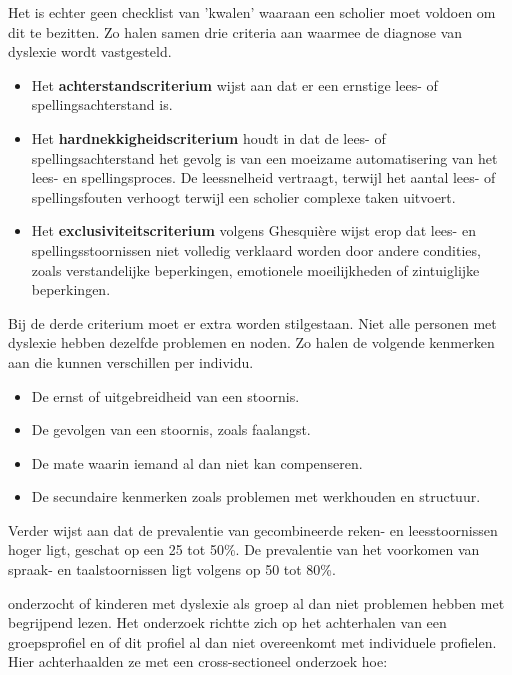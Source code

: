 Het is echter geen checklist van 'kwalen' waaraan een scholier moet voldoen om dit te bezitten. Zo halen \textcite{Kleijnen2008, Ghesquiere2018} samen drie criteria aan waarmee de diagnose van dyslexie wordt vastgesteld.

\begin{itemize}
	\item Het \textbf{achterstandscriterium} wijst aan dat er een ernstige lees- of spellingsachterstand is. 
	\item Het \textbf{hardnekkigheidscriterium} houdt in dat de lees- of spellingsachterstand het gevolg is van een moeizame automatisering van het lees- en spellingsproces. De leessnelheid vertraagt, terwijl het aantal lees- of spellingsfouten verhoogt terwijl een scholier complexe taken uitvoert.
	\item Het \textbf{exclusiviteitscriterium} volgens Ghesquière wijst erop dat lees- en spellingsstoornissen niet volledig verklaard worden door andere condities, zoals verstandelijke beperkingen, emotionele moeilijkheden of zintuiglijke beperkingen.
\end{itemize}


Bij de derde criterium moet er extra worden stilgestaan. Niet alle personen met dyslexie hebben dezelfde problemen en noden. Zo halen \textcite{VanVreckem2015, Ghesquiere2018} de volgende kenmerken aan die kunnen verschillen per individu.

\begin{itemize}
	\item De ernst of uitgebreidheid van een stoornis.
	\item De gevolgen van een stoornis, zoals faalangst.
	\item De mate waarin iemand al dan niet kan compenseren.
	\item De secundaire kenmerken zoals problemen met werkhouden en structuur.
\end{itemize}



Verder wijst \textcite{Desoete2015} aan dat de prevalentie van gecombineerde reken- en leesstoornissen hoger ligt, geschat op een 25 tot 50\%. De prevalentie van het voorkomen van spraak- en taalstoornissen ligt volgens \textcite{Dirks2008, Desoete2017} op 50 tot 80\%.


\textcite{VanVreckem2015} onderzocht of kinderen met dyslexie als groep al dan niet problemen hebben met begrijpend lezen. Het onderzoek richtte zich op het achterhalen van een groepsprofiel en of dit profiel al dan niet overeenkomt met individuele profielen. Hier achterhaalden ze met een cross-sectioneel onderzoek hoe:


